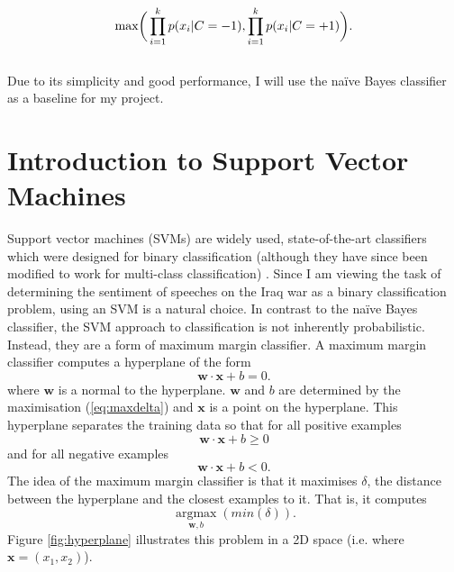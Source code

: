 \documentclass[12pt,a4paper,twoside,openright]{report}
\begin{document}
\begin{equation}
\text{max} \bigg( \displaystyle \prod_{i = 1}^{k}p(x_i | C = -1), \prod_{i = 1}^{k}p(x_i | C = +1) \bigg). \\
\end{equation}
\\
Due to its simplicity and good performance, I will use the na\"{i}ve Bayes classifier as a baseline for my project.
\section{Introduction to Support Vector Machines} \label{prep-svm}

Support vector machines (SVMs) are widely used, state-of-the-art classifiers which were designed for binary classification (although they have since been modified to work for multi-class classification) \cite{ml_book}. Since I am viewing the task of determining the sentiment of speeches on the Iraq war as a binary classification problem, using an SVM is a natural choice.
\newline
\newline
In contrast to the na\"{i}ve Bayes classifier, the SVM approach to classification is not inherently probabilistic. Instead, they are a form of maximum margin classifier. A maximum margin classifier computes a hyperplane of the form
\begin{equation} \label{eq:hyperplane}
	\mathbf{w} \cdot \mathbf{x} + b = 0.
\end{equation}
where $\mathbf{w}$ is a normal to the hyperplane. $\mathbf{w}$ and $b$ are determined by the maximisation (\ref{eq:maxdelta}) and $\mathbf{x}$ is a point on the hyperplane. This hyperplane separates the training data so that for all positive examples
\begin{equation}
\mathbf{w} \cdot \mathbf{x} + b \ge 0
\end{equation}
and for all negative examples
\begin{equation}
\mathbf{w} \cdot \mathbf{x} + b < 0.
\end{equation}
The idea of the maximum margin classifier is that it maximises $\delta$, the distance between the hyperplane and the closest examples to it. That is, it computes
\begin{equation} \label{eq:maxdelta}
	\underset{\mathbf{w}, b}{\operatorname{argmax}}(min(\delta)).
\end{equation}
Figure \ref{fig:hyperplane} illustrates this problem in a 2D space (i.e. where $\mathbf{x} = (x_1, x_2)$).
\end{document}

